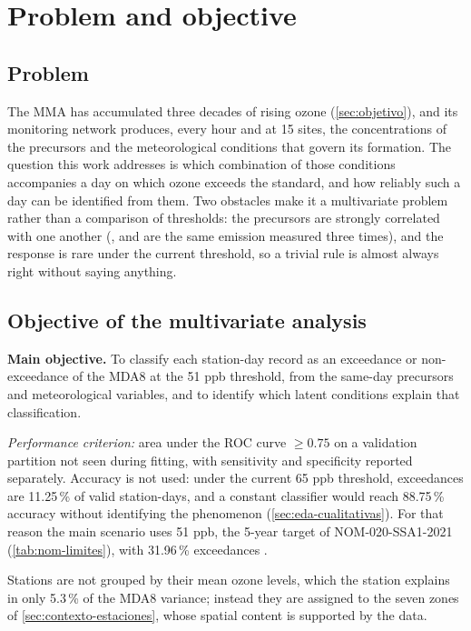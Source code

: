 \section{Problem and objective}
\label{sec:objetivo-tecnicas}

\subsection{Problem}

The MMA has accumulated three decades of rising ozone (\cref{sec:objetivo}),
and its monitoring network produces, every hour and at 15 sites, the
concentrations of the precursors and the meteorological conditions that
govern its formation. The question this work addresses is which combination
of those conditions accompanies a day on which ozone exceeds the standard,
and how reliably such a day can be identified from them. Two obstacles make
it a multivariate problem rather than a comparison of thresholds: the
precursors are strongly correlated with one another (,  and
 are the same emission measured three times), and the response is
rare under the current threshold, so a trivial rule is almost always right
without saying anything.

\subsection{Objective of the multivariate analysis}
\label{sec:obj:objetivo}

\textbf{Main objective.} To classify each station-day record as an
exceedance or non-exceedance of the MDA8 at the 51 ppb threshold, from the
same-day precursors and meteorological variables, and to identify which
latent conditions explain that classification.

\textit{Performance criterion:} area under the ROC curve $\geq 0.75$ on a
validation partition not seen during fitting, with sensitivity and
specificity reported separately. Accuracy is not used: under the current
65 ppb threshold, exceedances are 11.25\,\% of valid station-days, and a
constant classifier would reach 88.75\,\% accuracy without identifying the
phenomenon (\cref{sec:eda-cualitativas}). For that reason the main scenario
uses 51 ppb, the 5-year target of NOM-020-SSA1-2021 (\cref{tab:nom-limites}),
with 31.96\,\% exceedances \parencite{saito2015}.

Stations are not grouped by their mean ozone levels, which the station
explains in only 5.3\,\% of the MDA8 variance; instead they are assigned to
the seven zones of \cref{sec:contexto-estaciones}, whose spatial content is
supported by the data.

